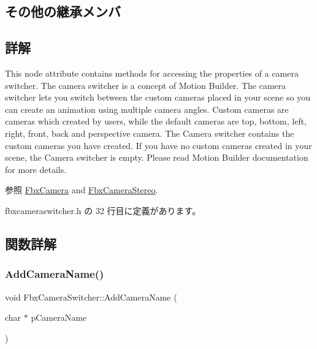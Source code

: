 \subsection*{その他の継承メンバ}


\subsection{詳解}
This node attribute contains methods for accessing the properties of a camera switcher. The camera switcher is a concept of Motion Builder. The camera switcher lets you switch between the custom cameras placed in your scene so you can create an animation using multiple camera angles. Custom cameras are cameras which created by users, while the default cameras are top, bottom, left, right, front, back and perspective camera. The Camera switcher contains the custom cameras you have created. If you have no custom cameras created in your scene, the Camera switcher is empty. Please read Motion Builder documentation for more details.

\begin{DoxySeeAlso}{参照}
\hyperlink{class_fbx_camera}{Fbx\+Camera} and \hyperlink{class_fbx_camera_stereo}{Fbx\+Camera\+Stereo}. 
\end{DoxySeeAlso}


 fbxcameraswitcher.\+h の 32 行目に定義があります。



\subsection{関数詳解}
\mbox{\label{class_fbx_camera_switcher_a0b10a6c548f79eb7b3917807429ac8bb}} 
\subsubsection{\texorpdfstring{Add\+Camera\+Name()}{AddCameraName()}}
{\footnotesize\ttfamily void Fbx\+Camera\+Switcher\+::\+Add\+Camera\+Name (\begin{DoxyParamCaption}\item[{char $\ast$}]{p\+Camera\+Name }\end{DoxyParamCaption})}

\mbox{\label{class_fbx_camera_switcher_a19e4199ca22422dd83db62938c7f7b55}} 

